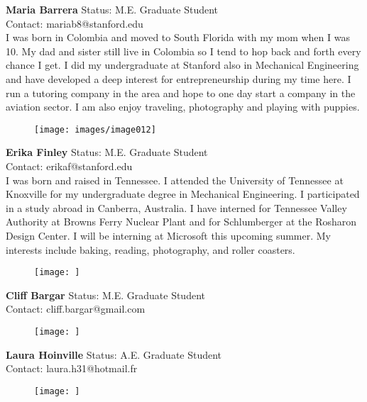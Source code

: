 \textbf{Maria Barrera}
Status: M.E. Graduate Student \\
Contact: mariab8@stanford.edu \\
I was born in Colombia and moved to South Florida with my mom when I was 10. My dad and sister still live in Colombia so I tend to hop back and forth every chance I get. I did my undergraduate at Stanford also in Mechanical Engineering and have developed a deep interest for entrepreneurship during my time here. I run a tutoring company in the area and hope to one day start a company in the aviation sector. I am also enjoy traveling, photography and playing with puppies.

\begin{figure}[h]
  \centering
     \texttt{[image: images/image012]}
  \label{fig:12}
\end{figure}

\textbf{Erika Finley}
Status: M.E. Graduate Student \\
Contact: erikaf@stanford.edu \\
I was born and raised in Tennessee. I attended the University of Tennessee at Knoxville for my undergraduate degree in Mechanical Engineering.  I participated in a study abroad in Canberra, Australia.  I have interned for Tennessee Valley Authority at Browns Ferry Nuclear Plant and for Schlumberger at the Rosharon Design Center. I will be interning at Microsoft this upcoming summer. My interests include baking, reading, photography, and roller coasters.  

\begin{figure}[h]
  \centering
     \texttt{[image: ]}
  \label{fig:12}
\end{figure}

\textbf{Cliff Bargar}
Status: M.E. Graduate Student \\
Contact: cliff.bargar@gmail.com \\


\begin{figure}[h]
  \centering
     \texttt{[image: ]}
  \label{fig:12}
\end{figure}

\textbf{Laura Hoinville}
Status: A.E. Graduate Student \\
Contact: laura.h31@hotmail.fr \\

\begin{figure}[h]
  \centering
     \texttt{[image: ]}
  \label{fig:12}
\end{figure}

